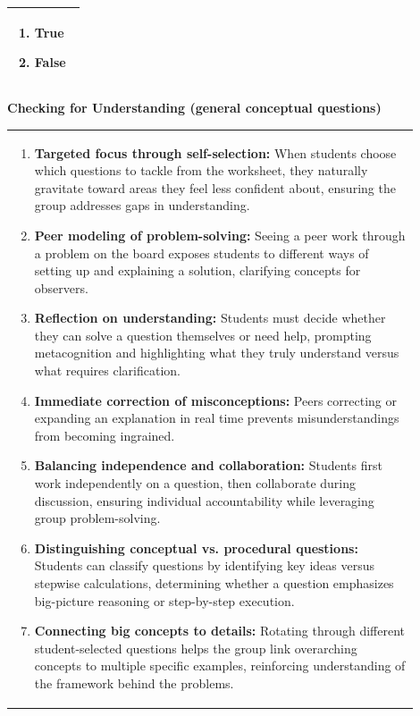 \documentclass{article}
\begin{document}
{{\begin{tabular}{|p{0.9\linewidth}|}
\begin{minipage}[t]{0.85\linewidth}
\begin{enumerate}[label=\alph*.]
\item True
\item False
\end{enumerate}
\end{minipage}\\[0.2cm]
\hline
\end{tabular}

\newpage
{\large\textbf{Checking for Understanding (general conceptual questions)}}\\
\noindent \begin{tabular}{|p{0.9\linewidth}|}
\hline
\vspace{0.2cm}

\begin{enumerate}
    \item \textbf{Targeted focus through self-selection:} When students choose which questions to tackle from the worksheet, they naturally gravitate toward areas they feel less confident about, ensuring the group addresses gaps in understanding.
    \item \textbf{Peer modeling of problem-solving:} Seeing a peer work through a problem on the board exposes students to different ways of setting up and explaining a solution, clarifying concepts for observers.
    \item \textbf{Reflection on understanding:} Students must decide whether they can solve a question themselves or need help, prompting metacognition and highlighting what they truly understand versus what requires clarification.
    \item \textbf{Immediate correction of misconceptions:} Peers correcting or expanding an explanation in real time prevents misunderstandings from becoming ingrained.
    \item \textbf{Balancing independence and collaboration:} Students first work independently on a question, then collaborate during discussion, ensuring individual accountability while leveraging group problem-solving.
    \item \textbf{Distinguishing conceptual vs. procedural questions:} Students can classify questions by identifying key ideas versus stepwise calculations, determining whether a question emphasizes big-picture reasoning or step-by-step execution.
    \item \textbf{Connecting big concepts to details:} Rotating through different student-selected questions helps the group link overarching concepts to multiple specific examples, reinforcing understanding of the framework behind the problems.

\end{enumerate}
\end{tabular}}}
\end{document}
